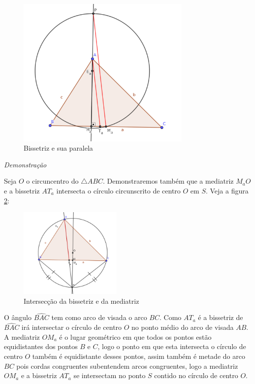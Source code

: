 \documentclass[12pt, openright, a4paper, brazil, openany, oneside]{abntex2}
\begin{document}
\begin{figure}[h]
	
	\center
	
	\includegraphics[width=8.5cm]{trianguloteo.png}
	\caption{Bissetriz e sua paralela \label{triateo}}
	
\end{figure}

\textit{Demonstração}

Seja $O$ o circuncentro do $\triangle ABC$. Demonstraremos também que a mediatriz $M_{a}O$ e a bissetriz $AT_a$ intersecta o círculo circunscrito de centro $O$ em $S$. Veja a figura \ref{trianbismed}:

\begin{figure}[h]
	
	\center
	
	\includegraphics[width=5cm]{triangulocirc.png}
	\caption{Intersecção da bissetriz e da mediatriz\label{trianbismed}}
	
\end{figure}

O ângulo $\hat{BAC}$ tem como arco de visada o arco $BC$. Como $AT_a$ é a bissetriz de $\hat{BAC}$ irá intersectar o círculo de centro $O$ no ponto médio do arco de visada $AB$. A mediatriz $OM_a$ é o lugar geométrico em que todos os pontos estão equidistantes dos pontos $B$ e $C$, logo o ponto em que esta intersecta o círculo de centro $O$ também é equidistante desses pontos, assim também é metade do arco $BC$ pois cordas congruentes subentendem arcos congruentes, logo a mediatriz $OM_a$ e a bissetriz $AT_a$ se intersectam no ponto $S$ contido no círculo de centro $O$.
\end{document}
